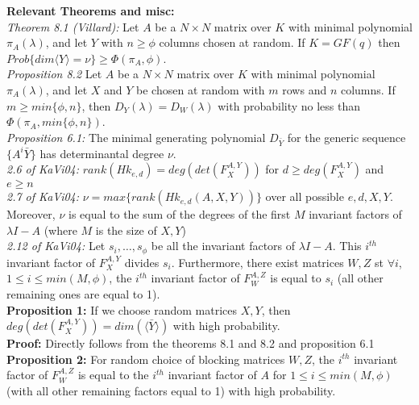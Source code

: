 \documentclass[12pt]{article}
\begin{document}
\noindent\textbf{Relevant Theorems and misc:}\\
\noindent\textit{Theorem 8.1 (Villard):} Let $A$ be a $N \times N$ matrix over $K$ with minimal polynomial $\pi_A(\lambda)$,
and let $Y$ with $n \ge \phi$ columns chosen at random. If $K = GF(q)$ then $Prob\{dim \langle Y \rangle = \nu \} \ge
\Phi(\pi_A,\phi)$.\\

\noindent\textit{Proposition 8.2} Let $A$ be a $N \times N$ matrix over $K$ with minimal polynomial $\pi_A(\lambda)$,
and let $X$ and $Y$ be chosen at random with $m$ rows and $n$ columns. If $m \ge min\{\phi,n\}$, then $D_Y(\lambda) = D_W(\lambda)$
with probability no less than $\Phi(\pi_A,min\{\phi,n\})$.\\

\noindent\textit{Proposition 6.1:} The minimal generating polynomial $D_{\bar{Y}}$ for the generic
sequence $\{A^i\bar{Y}\}$ has determinantal degree $\nu$.\\

\noindent\textit{2.6 of KaVi04:} $rank(Hk_{e,d}) = deg(det(F_X^{A,Y}))$ for $d \ge deg(F_X^{A,Y})$ and $e \ge n$\\

\noindent\textit{2.7 of KaVi04:} $\nu = max\{ rank(Hk_{e,d}(A,X,Y))\}$ over all possible $e,d,X,Y$. Moreover, $\nu$ is equal to the sum of the
degrees of the first $M$ invariant factors of $\lambda I -A$ (where $M$ is the size of $X,Y$)\\

\noindent\textit{2.12 of KaVi04:} Let $s_i,\dots, s_\phi$ be all the invariant factors of $\lambda I - A$. This $i^{th}$ invariant factor of
$F_X^{A,Y}$ divides $s_i$. Furthermore, there exist matrices $W,Z$ st $\forall i$, $1 \le i \le min(M,\phi)$, the $i^{th}$ invariant factor of
$F_W^{A,Z}$ is equal to $s_i$ (all other remaining ones are equal to 1).\\

\noindent\textbf{Proposition 1:} If we choose random matrices $X,Y$, then $deg(det(F_X^{A,Y})) = dim(\langle \bar{Y} \rangle)$ 
with high probability.\\

\noindent\textbf{Proof:} Directly follows from the theorems 8.1 and 8.2 and proposition 6.1\\

\noindent\textbf{Proposition 2:} For random choice of blocking matrices $W,Z$, the $i^{th}$ invariant factor of $F_W^{A,Z}$ is equal to the $i^{th}$ 
invariant factor of $A$ for $1 \le i \le min(M,\phi)$ (with all other remaining factors equal to 1) with high probability.\\
\end{document}
